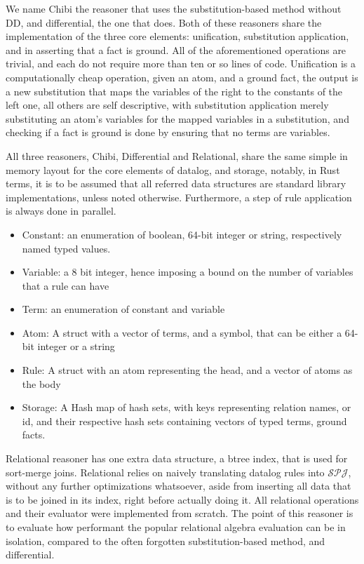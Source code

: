 \documentclass[sigconf,screen,review=false,natbib]{acmart}
\theoremstyle{definition}
\begin{document}
We name Chibi the reasoner that uses the substitution-based method without DD, and differential, the one
that does. Both of these reasoners share the implementation of the three core elements: unification, substitution application,
and in asserting that a fact is ground. All of the aforementioned operations are trivial, and each do not require more than
ten or so lines of code. Unification is a computationally cheap operation, given an atom, and a ground fact, the output is
a new substitution that maps the variables of the right to the constants of the left one, all others are self descriptive,
with substitution application merely substituting an atom's variables for the mapped variables in a substitution, and checking
if a fact is ground is done by ensuring that no terms are variables.

All three reasoners, Chibi, Differential and Relational, share the same simple in memory layout for the core elements of
datalog, and storage, notably, in Rust terms, it is to be assumed that all referred data structures are standard library
implementations, unless noted otherwise. Furthermore, a step of rule application is always done in parallel.
\begin{itemize}
	\item Constant: an enumeration of boolean, 64-bit integer or string, respectively named typed values.
	\item Variable: a 8 bit integer, hence imposing a bound on the number of variables that a rule can have
	\item Term: an enumeration of constant and variable
	\item Atom: A struct with a vector of terms, and a symbol, that can be either a 64-bit integer or a string
	\item Rule: A struct with an atom representing the head, and a vector of atoms as the body
	\item Storage: A Hash map of hash sets, with keys representing relation names, or id, and their respective
	      hash sets containing vectors of typed terms, ground facts.
\end{itemize}
Relational reasoner has one extra data structure, a btree index, that is used for sort-merge joins. Relational relies on
naively translating datalog rules into $\mathcal{SPJ}$, without any further optimizations whatsoever, aside from inserting
all data that is to be joined in its index, right before actually doing it. All relational operations and their evaluator
were implemented from scratch. The point of this reasoner is to evaluate how performant the popular relational algebra
evaluation can be in isolation, compared to the often forgotten substitution-based method, and differential.
\end{document}
